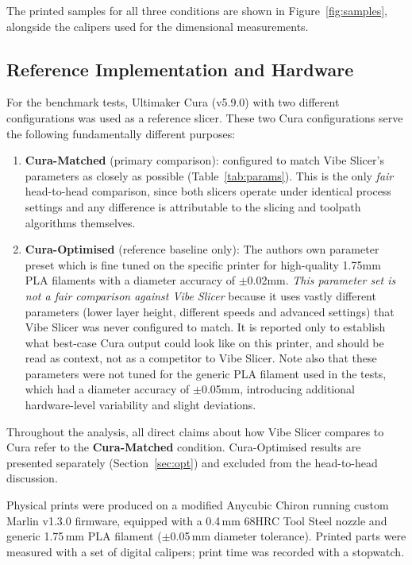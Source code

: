 \documentclass[10pt,twocolumn,a4paper]{article}
\begin{document}
The printed samples for all three conditions are shown in
Figure~\ref{fig:samples}, alongside the calipers used for
the dimensional measurements.

\subsection{Reference Implementation and Hardware}

For the benchmark tests, Ultimaker Cura (v5.9.0) with two different configurations was used as a reference slicer.
These two Cura configurations  serve the following fundamentally different purposes:

\begin{enumerate}
  \item \textbf{Cura-Matched} (primary comparison): configured
        to match Vibe Slicer's parameters as closely as possible
        (Table~\ref{tab:params}). This is the only \emph{fair}
        head-to-head comparison, since both slicers operate under
        identical process settings and any difference is attributable
        to the slicing and toolpath algorithms themselves.
  \item \textbf{Cura-Optimised} (reference baseline only):
        The authors own parameter preset which is fine tuned on the specific printer for high-quality 1.75mm PLA filaments with a diameter accuracy of $\pm$0.02mm.
        \emph{This parameter set is not a fair comparison against Vibe Slicer}
        because it uses vastly different parameters (lower layer height,
        different speeds and advanced settings) that Vibe Slicer was never
        configured to match. It is reported only to establish what
        best-case Cura output could look like on this printer, and should
        be read as context, not as a competitor to Vibe Slicer.
        Note also that these parameters were not tuned for the generic
        PLA filament used in the tests, which had a diameter accuracy of $\pm$0.05mm, introducing additional hardware-level variability and slight deviations.
\end{enumerate}

Throughout the analysis, all direct claims about how Vibe Slicer
compares to Cura refer to the \textbf{Cura-Matched} condition.
Cura-Optimised results are presented separately
(Section~\ref{sec:opt}) and excluded from the head-to-head
discussion.

Physical prints were produced on a modified Anycubic Chiron
running custom Marlin v1.3.0 firmware, equipped with a 0.4\,mm
68HRC Tool Steel nozzle and generic 1.75\,mm PLA filament ($\pm$0.05\,mm
diameter tolerance). Printed parts were measured with a set of
digital calipers; print time was recorded with a stopwatch.
\end{document}
